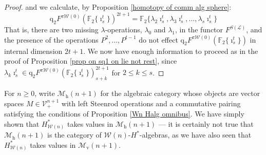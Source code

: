 \documentclass[11pt]{amsart} \renewcommand{\baselinestretch}{1.2}
\theoremstyle{plain}
\numberwithin{equation}{section} %
\theoremstyle{plain}
\numberwithin{equation}{chapter} %
\newcommand{\scrL}{\mathscr{L}}
\newcommand{\calV}{\mathcal{V}}
\newcommand{\calw}{\mathcal{W}}
\newcommand{\calMv}{\mathcal{M}\dver}
\newcommand{\calMh}{\mathcal{M}\dhor}
\newcommand{\LieOperad}{{\scrL}}
\newcommand{\vect}[2]{\calV^{#1}_{#2}}
\newcommand{\PA}[1]{\pi#1}
\newcommand{\quadgrad}[1]{\mathrm{q}_{#1}}
\newcommand{\F}{\mathbb{F}}
\newcommand{\Ftwo}{\F_2}
\newcommand{\dver}{_\mathrm{v}}
\newcommand{\dhor}{_\mathrm{h}}
\begin{document}
\begin{Cohomology Operations for W and U}
\begin{proof}
and
we calculate, by Proposition \ref{homotopy of comm alg sphere}:
\[\quadgrad{2}F^{\PA{\calw(0)}}(\Ftwo\{\imath^t_s\})^{2t+1}=\Ftwo\{\lambda_2\imath^t_s,\lambda_3\imath^t_s,\ldots,\lambda_s\imath^t_s\}\]
 That is, there are two missing $\lambda$-operations, $\lambda_0$ and $\lambda_1$, in the functor $F^{S(\LieOperad)}$, and the presence of the operations $P^2,\ldots,P^{t-1}$ do not effect $\quadgrad{2}F^{\PA{\calw(0)}}(\Ftwo\{\imath^t_s\})$ in internal dimension $2t+1$. We now have enough information to proceed as in the proof of Proposition \ref{prop on sq1 on lie not rest}, since $\lambda_k\imath^t_s\in \quadgrad{2}F^{\PA{\calw(0)}}(\Ftwo\{\imath^t_s\})^{2t+1}_{s+k}$ for $2\leq k\leq s$.
\end{proof}



For $n\geq0$, write $\calMh(n+1)$ for the algebraic category whose objects are vector spaces $M\in\vect{n+1}{+}$ with left Steenrod operations and a commutative pairing satisfying the conditions of Proposition \ref{Wn Halg omnibus}. We have simply shown that $H^*_{\calw(n)}$ takes values in $\calMh(n+1)$ --- it is certainly not true that $\calMh(n+1)$ is the category of $\calw(n)$-$H^*$-algebras, as we have also seen that $H^*_{\calw(n)}$ takes values in $\calMv(n+1)$.


\end{Cohomology Operations for W and U}
\end{document}
